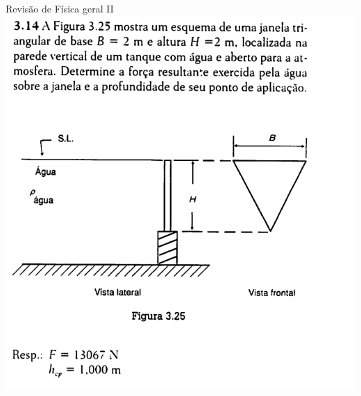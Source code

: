 \documentclass[t,%
brazilian,%
11pt,%
aspectratio=169,%
table%
]{beamer}
\begin{document}
\begin{frame}{Revisão de Física geral II}
     \centering
     \includegraphics[height=\textheight-28pt]{images/Captura de tela de 2025-04-08 17-54-50.png}
\end{frame}
\end{document}
